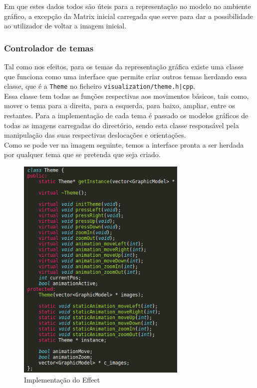 \documentclass[portugues,final]{revdetua}
\begin{document}
Em que estes dados todos são úteis para a representação no modelo no ambiente gráfico, a excepção da Matrix inicial carregada que serve para dar a possibilidade ao utilizador de voltar a imagem inicial.

\subsubsection{Controlador de temas}

Tal como nos efeitos, para os temas da representação gráfica existe uma classe que funciona como uma interface que permite criar outros temas herdando essa classe, que é a {\tt Theme} no ficheiro {\tt visualization/theme.{h|c}pp}.\\

Essa classe tem todas as funções respectivas aos movimentos básicos, tais como, mover o tema para a direita, para a esquerda, para baixo, ampliar, entre os restantes. Para a implementação de cada tema é passado os modelos gráficos de todas as imagens carregadas do directório, sendo esta classe responsável pela manipulação das suas respectivas deslocações e orientações.\\

Como se pode ver na imagem seguinte, temos a interface pronta a ser herdada por qualquer tema que se pretenda que seja criado.

\begin{figure}[H]
\centerline{\includegraphics[width=230pt]{images/theme.png}}
\caption{Implementação do Effect}
\label{img:complete}
\end{figure}
\end{document}

